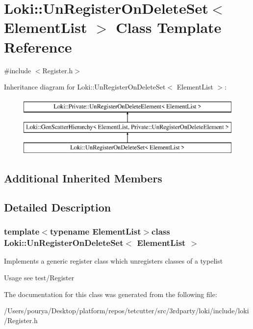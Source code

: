 \hypertarget{structLoki_1_1UnRegisterOnDeleteSet}{}\section{Loki\+:\+:Un\+Register\+On\+Delete\+Set$<$ Element\+List $>$ Class Template Reference}
\label{structLoki_1_1UnRegisterOnDeleteSet}


{\ttfamily \#include $<$Register.\+h$>$}

Inheritance diagram for Loki\+:\+:Un\+Register\+On\+Delete\+Set$<$ Element\+List $>$\+:\begin{figure}[H]
\begin{center}
\leavevmode
\includegraphics[height=3.000000cm]{structLoki_1_1UnRegisterOnDeleteSet}
\end{center}
\end{figure}
\subsection*{Additional Inherited Members}


\subsection{Detailed Description}
\subsubsection*{template$<$typename Element\+List$>$class Loki\+::\+Un\+Register\+On\+Delete\+Set$<$ Element\+List $>$}

Implements a generic register class which unregisters classes of a typelist

\begin{DoxyParagraph}{Usage}
see test/\+Register 
\end{DoxyParagraph}


The documentation for this class was generated from the following file\+:\begin{DoxyCompactItemize}
\item 
/\+Users/pourya/\+Desktop/platform/repos/tetcutter/src/3rdparty/loki/include/loki/Register.\+h\end{DoxyCompactItemize}
